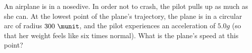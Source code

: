 An airplane is in a nosedive. In order not to crash, the pilot pulls
up as much as she can. At the lowest point of the plane's trajectory,
the plane is in a circular arc of radius $300\ \munit$, and the pilot
experiences an acceleration of $5.0g$ (so that her weight feels like
six times normal). What is the plane's speed at this
point?\answercheck
